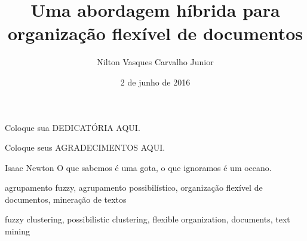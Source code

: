 \documentclass[bsc, classic, a4paper, oneside]{ufbathesis}
\institute{INSTITUTO DE MATEMÁTICA}
\title{Uma abordagem híbrida para organização flexível de documentos}
\date{2 de junho de 2016}
\author{Nilton Vasques Carvalho Junior}
\begin{document}
\pgcompfrontpage{}

\frontmatter

\pgcomppresentationpage

\catalogingsheet


\begin{dedicatory}
Coloque sua DEDICATÓRIA AQUI.
\end{dedicatory}

\acknowledgements
Coloque seus AGRADECIMENTOS AQUI.

\begin{epigraph}[1687]{Isaac Newton}
  O que sabemos é uma gota, o que ignoramos é um oceano.
\end{epigraph}

\resumo

\begin{keywords}
agrupamento fuzzy, agrupamento possibilístico, organização flexível de documentos, 
mineração de textos
\end{keywords}

\abstract

\begin{keywords}
fuzzy clustering, possibilistic clustering, flexible organization, documents, text mining
\end{keywords}
\end{document}
